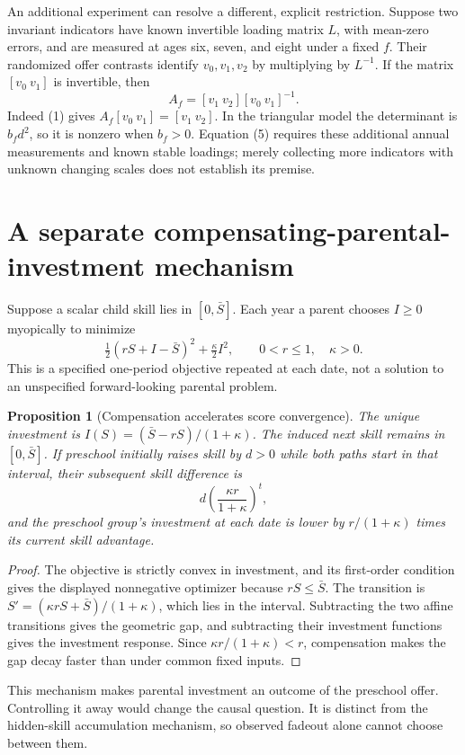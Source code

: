 \documentclass[11pt,a4paper]{article}
\newtheorem{proposition}[theorem]{Proposition}
\theoremstyle{remark}
\begin{document}
An additional experiment can resolve a different, explicit restriction. Suppose two invariant indicators have known invertible loading matrix $L$, with mean-zero errors, and are measured at ages six, seven, and eight under a fixed $f$. Their randomized offer contrasts identify $v_0,v_1,v_2$ by multiplying by $L^{-1}$. If the matrix $[v_0\ v_1]$ is invertible, then
\[
 A_f=[v_1\ v_2][v_0\ v_1]^{-1}. \tag{5}
\]
Indeed (1) gives $A_f[v_0\ v_1]=[v_1\ v_2]$. In the triangular model the determinant is $b_fd^2$, so it is nonzero when $b_f>0$. Equation (5) requires these additional annual measurements and known stable loadings; merely collecting more indicators with unknown changing scales does not establish its premise.

\section{A separate compensating-parental-investment mechanism}
Suppose a scalar child skill lies in $[0,\bar S]$. Each year a parent chooses $I\ge0$ myopically to minimize
\[
 \tfrac12(rS+I-\bar S)^2+\tfrac\kappa2I^2,
 \qquad0<r\le1,\quad\kappa>0.
\]
This is a specified one-period objective repeated at each date, not a solution to an unspecified forward-looking parental problem.

\begin{proposition}[Compensation accelerates score convergence]
The unique investment is $I(S)=(\bar S-rS)/(1+\kappa)$. The induced next skill remains in $[0,\bar S]$. If preschool initially raises skill by $d>0$ while both paths start in that interval, their subsequent skill difference is
\[
 d\left(\frac{\kappa r}{1+\kappa}\right)^t,
\]
and the preschool group's investment at each date is lower by $r/(1+\kappa)$ times its current skill advantage.
\end{proposition}
\begin{proof}
The objective is strictly convex in investment, and its first-order condition gives the displayed nonnegative optimizer because $rS\le\bar S$. The transition is
$S'=(\kappa rS+\bar S)/(1+\kappa)$, which lies in the interval. Subtracting the two affine transitions gives the geometric gap, and subtracting their investment functions gives the investment response. Since $\kappa r/(1+\kappa)<r$, compensation makes the gap decay faster than under common fixed inputs.
\end{proof}
This mechanism makes parental investment an outcome of the preschool offer. Controlling it away would change the causal question. It is distinct from the hidden-skill accumulation mechanism, so observed fadeout alone cannot choose between them.
\end{document}
